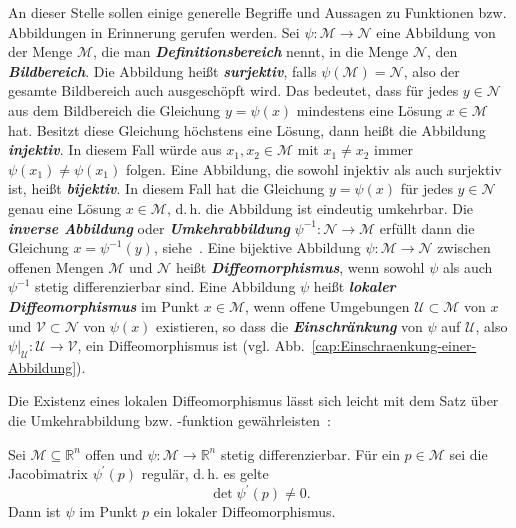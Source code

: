 \begin{remark}
\label{rem:Umkehrabbildung-Diffeomorphismus}An dieser Stelle sollen
einige generelle Begriffe und Aussagen zu Funktionen bzw. Abbildungen
in Erinnerung gerufen werden. Sei $\psi:\mathcal{M}\to\mathcal{N}$
eine Abbildung von der Menge $\mathcal{M}$, die man \textbf{\em Definitionsbereich}
nennt, in die Menge $\mathcal{N}$, den \textbf{\em Bildbereich}. Die Abbildung
heißt \textbf{\em surjektiv}, falls $\psi(\mathcal{M})=\mathcal{N}$,
also der gesamte Bildbereich auch ausgeschöpft wird. Das bedeutet,
dass für jedes $y\in\mathcal{N}$ aus dem Bildbereich die Gleichung
$y=\psi(x)$ mindestens eine Lösung $x\in\mathcal{M}$ hat. Besitzt
diese Gleichung höchstens eine Lösung, dann heißt die Abbildung \textbf{\em injektiv}.
In diesem Fall würde aus $x_{1},x_{2}\in\mathcal{M}$ mit $x_{1}\neq x_{2}$
immer $\psi(x_{1})\neq\psi(x_{1})$ folgen. Eine Abbildung, die sowohl
injektiv als auch surjektiv ist, heißt \textbf{\em bijektiv}.
In diesem Fall hat die Gleichung $y=\psi(x)$ für jedes $y\in\mathcal{N}$
genau eine Lösung $x\in\mathcal{M}$, d.\,h. die Abbildung ist eindeutig
umkehrbar. Die \textbf{\em inverse Abbildung} oder \textbf{\em Umkehrabbildung}
$\psi^{-1}:\mathcal{N}\to\mathcal{M}$ erfüllt dann die Gleichung
$x=\psi^{-1}(y)$, siehe~\cite{zeidler2003}. Eine bijektive Abbildung
$\psi:\mathcal{M}\to\mathcal{N}$ zwischen offenen Mengen $\mathcal{M}$
und $\mathcal{N}$ heißt \textbf{\em Diffeomorphismus},
wenn sowohl $\psi$ als auch $\psi^{-1}$ stetig differenzierbar sind.
Eine Abbildung $\psi$ heißt \textbf{\em lokaler Diffeomorphismus}
im Punkt $x\in\mathcal{M}$, wenn offene Umgebungen $\mathcal{U}\subset\mathcal{M}$
von $x$ und $\mathcal{V}\subset\mathcal{N}$ von $\psi(x)$ existieren,
so dass die \textbf{\em Einschränkung} von $\psi$ auf $\mathcal{U}$, also
$\left.\psi\right|_{\mathcal{U}}:\mathcal{U}\to\mathcal{V}$, ein
Diffeomorphismus ist (vgl. Abb.~\ref{cap:Einschraenkung-einer-Abbildung}).
\end{remark}


Die Existenz eines lokalen Diffeomorphismus lässt sich leicht mit
dem Satz über die Umkehrabbildung bzw. -funktion gewährleisten~\cite{hildebrandt2003-2,kerner2007}:
\begin{theorem}
\label{thm: Umkehrfunktion}Sei
$\mathcal{M}\subseteq{\mathbb{R}}^{n}$ offen und $\psi:\mathcal{M}\to{\mathbb{R}}^{n}$
stetig differenzierbar. Für ein $p\in\mathcal{M}$ sei die Jacobimatrix
$\psi^{\prime}(p)$ regulär, d.\,h. es gelte
\[
\det\psi^{\prime}(p)\neq0.
\]
Dann ist $\psi$ im Punkt $p$ ein lokaler Diffeomorphismus.
\end{theorem}


